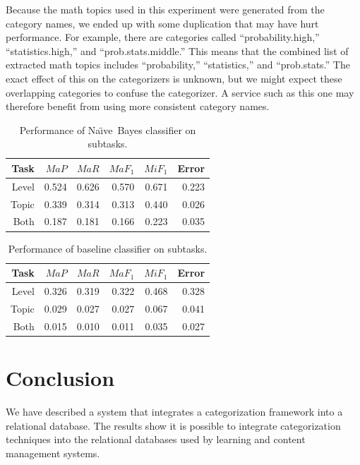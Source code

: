 \documentclass[twocolumn]{article}
\newcommand{\naive}{Na\"\i ve}
\begin{document}
Because the math topics used in this experiment were generated from
the category names, we ended up with some duplication that may have
hurt performance.  For example, there are categories called
``probability.high,'' ``statistics.high,'' and ``prob.stats.middle.''
This means that the combined list of extracted math topics includes
``probability,'' ``statistics,'' and ``prob.stats.''  The exact effect
of this on the categorizers is unknown, but we might expect these
overlapping categories to confuse the categorizer.  A service such as
this one may therefore benefit from using more consistent category
names.


\begin{table}
\begin{tabular}{|r|r|r|r|r|r|}
\hline
Task     & $MaP$   & $MaR$   & $MaF_1$ & $MiF_1$ & Error \\ \hline
Level    & 0.524   & 0.626   & 0.570   & 0.671   & 0.223 \\ \hline
Topic    & 0.339   & 0.314   & 0.313   & 0.440   & 0.026 \\ \hline
Both     & 0.187   & 0.181   & 0.166   & 0.223   & 0.035 \\ \hline
\end{tabular}
\caption{Performance of \naive\ Bayes classifier on subtasks.}
\label{results-NB}
\end{table}

\begin{table}
\begin{tabular}{|r|r|r|r|r|r|}
\hline
Task     & $MaP$   & $MaR$   & $MaF_1$ & $MiF_1$ & Error \\ \hline
Level    & 0.326   & 0.319   & 0.322   & 0.468   & 0.328 \\ \hline
Topic    & 0.029   & 0.027   & 0.027   & 0.067   & 0.041 \\ \hline
Both     & 0.015   & 0.010   & 0.011   & 0.035   & 0.027 \\ \hline
\end{tabular}
\caption{Performance of baseline classifier on subtasks.}
\label{results-baseline}
\end{table}


 
\section{Conclusion}

We have described a system that integrates a categorization framework into a 
relational database. The results show it is possible to integrate categorization 
techniques into the relational databases used by learning and content management 
systems.
\end{document}
